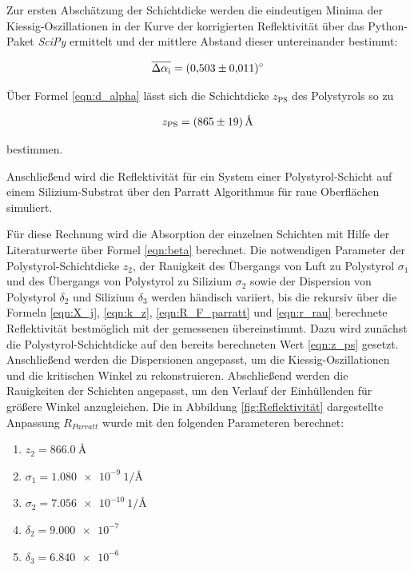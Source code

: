     \FloatBarrier

    Zur ersten Abschätzung der Schichtdicke werden die eindeutigen Minima der Kiessig-Oszillationen in der Kurve der korrigierten Reflektivität über das Python-Paket \textit{SciPy} ermittelt und der 
    mittlere Abstand dieser untereinander bestimmt:
    
    \begin{equation*}
      \overline{\Delta \alpha_{\text{i}}} = \SI{0.503+-0.011}{\degree}
    \end{equation*}
    
    Über Formel \ref{eqn:d_alpha} lässt sich die Schichtdicke $z_{\text{PS}}$ des Polystyrols so zu

    \begin{equation}
      z_{\text{PS}} = \SI{865+-19}{\angstrom}
      \label{eqn:z_ps}
    \end{equation}

    bestimmen.

    Anschließend wird die Reflektivität für ein System einer Polystyrol-Schicht auf einem Silizium-Substrat über den Parratt Algorithmus für raue Oberflächen simuliert.
    
    Für diese Rechnung wird die Absorption der einzelnen Schichten mit Hilfe der Literaturwerte \cite{tolan_x-ray_1999} über Formel \ref{eqn:beta} berechnet.
    Die notwendigen Parameter der Polystyrol-Schichtdicke $z_2$, der Rauigkeit des Übergangs von Luft zu Polystyrol $\sigma_1$ und des Übergangs von Polystyrol zu Silizium $\sigma_2$ sowie der Dispersion von
    Polystyrol $\delta_2$ und Silizium $\delta_3$ werden händisch variiert, bis die rekursiv über die Formeln \ref{eqn:X_j}, \ref{eqn:k_z}, \ref{eqn:R_F_parratt} und \ref{eqn:r_rau} berechnete Reflektivität 
    bestmöglich mit der gemessenen übereinstimmt. Dazu wird 
    zunächst die Polystyrol-Schichtdicke auf den bereits berechneten Wert \ref{eqn:z_ps} gesetzt. Anschließend werden die Dispersionen angepasst, um die Kiessig-Oszillationen und die kritischen Winkel
    zu rekonstruieren. Abschließend werden die Rauigkeiten der Schichten angepasst, um den Verlauf der Einhüllenden für größere Winkel anzugleichen. Die in Abbildung \ref{fig:Reflektivität} dargestellte 
    Anpassung $R_{Parratt}$ wurde mit den folgenden Parameteren berechnet:
    
    \begin{enumerate}
      \item $z_2=\SI{866.0}{\angstrom}$
      \item $\sigma_1=\SI{1.080e-9}{1\per\angstrom}$
      \item $\sigma_2=\SI{7.056e-10}{1\per\angstrom}$
      \item $\delta_2=\SI{9.000e-7}{}$
      \item $\delta_3=\SI{6.840e-6}{}$
    \end{enumerate}

